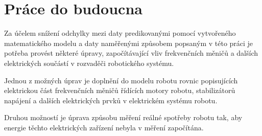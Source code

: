 \section{Práce do budoucna}

Za účelem snížení odchylky mezi daty predikovanými pomocí vytvořeného matematického modelu a daty naměřenými způsobem popsaným v této práci je potřeba provést některé úpravy, započítávající vliv frekvenčních měničů a dalších elektrických součástí v rozvaděči robotického systému. 

Jednou z možných úprav je doplnění do modelu robotu rovnic popisujících elektrickou část frekvenčních měničů řídících motory robotu, stabilizátorů napájení a dalších elektrických prvků v elektrickém systému robotu.

Druhou možností je úprava způsobu měření reálné spotřeby robotu tak, aby energie těchto elektrických zařízení nebyla v měření započítána.